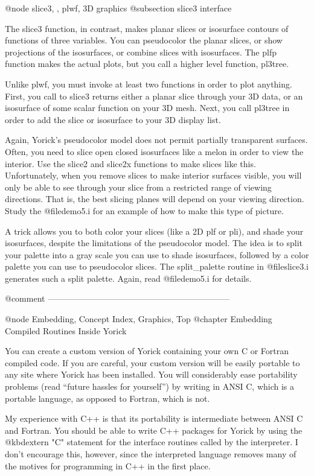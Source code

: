 @node slice3,  , plwf, 3D graphics
@subsection slice3 interface

The slice3 function, in contrast, makes planar slices or isosurface
contours of functions of three variables.  You can pseudocolor the
planar slices, or show projections of the isosurfaces, or combine
slices with isosurfaces.  The plfp function makes the actual plots,
but you call a higher level function, pl3tree.

Unlike plwf, you must invoke at least two functions in order to plot
anything.  First, you call to slice3 returns either a planar slice
through your 3D data, or an isosurface of some scalar function on your
3D mesh.  Next, you call pl3tree in order to add the slice or
isosurface to your 3D display list.

Again, Yorick's pseudocolor model does not permit partially transparent
surfaces.  Often, you need to slice open closed isosurfaces like a melon
in order to view the interior.  Use the slice2 and slice2x functions to
make slices like this.  Unfortunately, when you remove slices to make
interior surfaces visible, you will only be able to see through your
slice from a restricted range of viewing directions.  That is, the best
slicing planes will depend on your viewing direction.  Study the
@file{demo5.i} for an example of how to make this type of picture.

A trick allows you to both color your slices (like a 2D plf or pli), and
shade your isosurfaces, despite the limitations of the pseudocolor
model.  The idea is to split your palette into a gray scale you can use
to shade isosurfaces, followed by a color palette you can use to
pseudocolor slices.  The split_palette routine in @file{slice3.i}
generates such a split palette.  Again, read @file{demo5.i} for
details.




@comment -----------------------------------------------------------------

@node Embedding, Concept Index, Graphics, Top
@chapter Embedding Compiled Routines Inside Yorick

You can create a custom version of Yorick containing your own C or
Fortran compiled code.  If you are careful, your custom version will be
easily portable to any site where Yorick has been installed.  You will
considerably ease portability problems (read ``future hassles for
yourself'') by writing in ANSI C, which is a portable language, as
opposed to Fortran, which is not.

My experience with C++ is that its portability is intermediate between
ANSI C and Fortran.  You should be able to write C++ packages for Yorick
by using the @kbd{extern "C"} statement for the interface routines
called by the interpreter.  I don't encourage this, however, since the
interpreted language removes many of the motives for programming in C++
in the first place.

